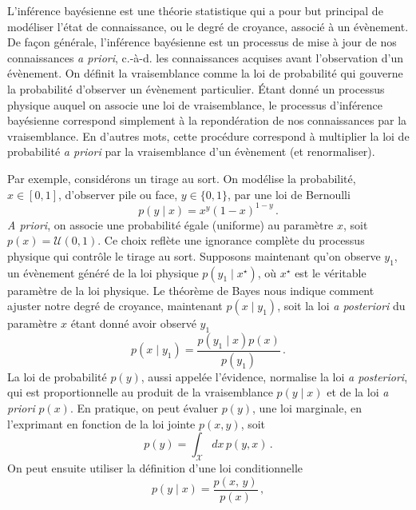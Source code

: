 L'inférence bayésienne est une théorie statistique qui a pour but principal de modéliser l'état de connaissance, 
ou le degré de croyance, associé à un évènement. De façon générale, l'inférence bayésienne est un processus de mise à jour de nos 
connaissances \textit{a priori}, c.-à-d. les connaissances acquises avant l'observation d'un évènement. 
On définit la vraisemblance comme la loi de probabilité qui gouverne la probabilité d'observer un évènement particulier.
Étant donné un processus physique auquel on associe une loi de vraisemblance, le processus d'inférence 
bayésienne correspond simplement à la repondération de nos connaissances par la vraisemblance. 
En d'autres mots, cette procédure correspond à multiplier la loi de probabilité \textit{a priori} par la vraisemblance d'un évènement (et renormaliser).

Par exemple, considérons un tirage au sort. 
On modélise la probabilité, $x \in [0, 1]$, d'observer pile ou face, $y \in \{0, 1\}$, 
par une loi de Bernoulli 
\begin{equation}
        p(y \mid x) = x^{y} (1 - x)^{1 - y}\, .
\end{equation} 
\textit{A priori}, on associe une probabilité égale (uniforme) au paramètre $x$, soit $p(x) = \mathcal{U}(0, 1)$. 
Ce choix reflète une ignorance complète du processus physique qui contrôle le tirage au sort.
Supposons maintenant qu'on observe $y_1$, un évènement généré de la loi physique $p(y_1 \mid x^{\star})$, où $x^{\star}$ est le véritable paramètre de la loi physique.
Le théorème de Bayes nous indique comment ajuster notre degré de croyance, maintenant $p(x \mid y_1)$, soit la loi \textit{a posteriori} du paramètre $x$ étant donné avoir observé $y_1$
\begin{equation}\label{eq:Bayes1}
        p(x \mid y_1) = \frac{p(y_1 \mid x) p(x)}{p(y_1)} \, .
\end{equation} 
La loi de probabilité $p(y)$, aussi appelée l'évidence, normalise la loi \textit{a posteriori}, qui est proportionnelle au produit de la vraisemblance $p(y \mid x)$ et 
de la loi \textit{a priori} $p(x)$. En pratique, on peut évaluer $p(y)$, une loi marginale, en l'exprimant 
en fonction de la loi jointe $p(x, y)$, soit 
\begin{equation}
        p(y) = \int_\mathcal{X} dx\, p(y, x) \, .
\end{equation} 
On peut ensuite utiliser la définition d'une loi conditionnelle 
\begin{equation}
        p(y \mid x) = \frac{p(x,\, y)}{p(x)} \, ,
\end{equation} 
